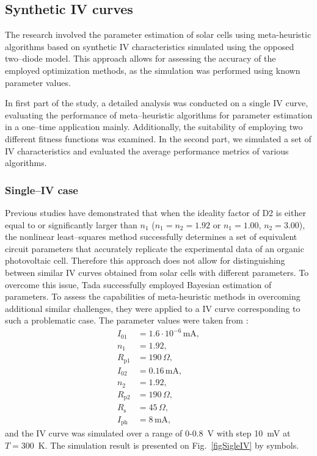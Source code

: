 \documentclass[a4paper,fleqn]{cas-dc}
\begin{document}
\subsection{Synthetic IV curves}\label{SynIV}
The research involved the parameter estimation of solar cells using meta-heuristic algorithms based
on synthetic IV characteristics simulated using the opposed two--diode model.
This approach allows for assessing the accuracy of the employed optimization methods,
as the simulation was performed using known parameter values.

In first part of the study, a detailed analysis was conducted on a single IV curve,
evaluating the performance of meta--heuristic algorithms for parameter estimation in a one--time application mainly.
Additionally, the suitability of employing two different fitness functions was examined.
In the second part, we simulated a set of IV characteristics and evaluated the average performance metrics of various algorithms.

\subsubsection{Single--IV case}\label{SingleIV}

Previous studies have demonstrated \cite{Tada2015Organic,Tada2021} that when the ideality factor of D2 is either equal to or significantly larger than $n_1$
($n_1=n_2=1.92$ or $n_1=1.00$, $n_2=3.00$), the nonlinear least--squares method successfully determines a set of equivalent circuit parameters
that accurately replicate the experimental data of an organic photovoltaic cell.
Therefore this approach does not allow for distinguishing between similar IV curves obtained from solar cells with different parameters.
To overcome this issue, Tada \cite{Tada2021} successfully employed Bayesian estimation of parameters.
To assess the capabilities of meta-heuristic methods in overcoming additional similar challenges,
they were applied to a IV curve corresponding to such a problematic case.
The parameter values were taken from \cite{Tada2021}:
\begin{equation}
\label{eqParSingleIV}
\begin{split}
I_{01}&=1.6\cdot10^{-6}\,\text{mA},\\
n_1&=1.92,\\
R_\mathrm{p1}&=190\,\Omega,\\
I_{02}&=0.16\,\text{mA},\\
n_2&=1.92,\\
R_\mathrm{p2}&=190\,\Omega,\\
R_\mathrm{s}&=45\,\Omega,\\
I_\mathrm{ph}&=8\,\text{mA},
\end{split}
\end{equation}
and the IV curve was simulated over a range of 0-0.8~V with step 10~mV at $T=300$~K.
The simulation result is presented on Fig.~\ref{figSigleIV} by symbols.
\end{document}
